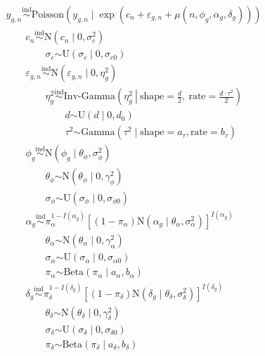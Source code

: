 \documentclass{article}\usepackage{graphicx, color}
\providecommand{\e}{\varepsilon}
\begin{document}
\begin{flushleft}
\begin{align*}
&y_{g,n} \stackrel{\text{ind}}{\sim} \text{Poisson}(y_{g, n} \mid \exp(c_n + \e_{g, n} + \mu(n, \phi_g, \alpha_g, \delta_g))) \\
&\qquad c_n \stackrel{\text{ind}}{\sim} \text{N}(c_n \mid 0, \sigma_c^2) \\
& \qquad \qquad \sigma_c \stackrel{\text{}}{\sim} \text{U}(\sigma_c \mid 0, \sigma_{c0}) \\
& \qquad \e_{g, n} \stackrel{\text{ind}}{\sim} \text{N}(\e_{g, n} \mid 0, \eta_g^2) \\
& \qquad \qquad \eta_g^2 \stackrel{\text{ind}}{\sim} \text{Inv-Gamma}\left (\eta_g^2 \ \left | \ \text{shape} = \frac{d}{2} \right ., \ \text{rate} =  \frac{d \cdot \tau^2}{2} \right) \\
& \qquad \qquad \qquad d \stackrel{\text{}}{\sim} \text{U}(d \mid 0, d_0) \\
& \qquad \qquad \qquad \tau^2 \stackrel{\text{}}{\sim} \text{Gamma}(\tau^2 \mid \text{shape} = a_\tau, \text{rate} = b_\tau) \\
& \qquad \phi_g \stackrel{\text{ind}}{\sim} \text{N}(\phi_g \mid \theta_\phi, \sigma_\phi^2) \\
& \qquad \qquad \theta_\phi \stackrel{\text{}}{\sim} \text{N}(\theta_\phi \mid 0, \gamma_{\phi }^2) \\
& \qquad \qquad \sigma_\phi \stackrel{\text{}}{\sim} \text{U}(\sigma_\phi \mid 0, \sigma_{\phi 0}) \\
& \qquad \alpha_g \stackrel{\text{ind}}{\sim} \pi_\alpha^{1-I(\alpha_g)}[(1- \pi_\alpha)\text{N}(\alpha_g \mid \theta_\alpha, \sigma_\alpha^2)]^{I(\alpha_g)} \\
& \qquad \qquad \theta_\alpha \stackrel{\text{}}{\sim} \text{N}(\theta_\alpha \mid 0, \gamma_{\alpha}^2) \\
& \qquad \qquad \sigma_\alpha \stackrel{\text{}}{\sim} \text{U}(\sigma_\alpha \mid 0, \sigma_{\alpha 0}) \\
& \qquad \qquad \pi_\alpha \stackrel{\text{}}{\sim} \text{Beta}(\pi_\alpha \mid a_{\alpha}, b_{\alpha}) \\
& \qquad \delta_g \stackrel{\text{ind}}{\sim} \pi_\delta^{1-I(\delta_g)}[(1- \pi_\delta)\text{N}(\delta_g \mid \theta_\delta, \sigma_\delta^2)]^{I(\delta_g)} \\& \qquad \qquad \theta_\delta \stackrel{\text{}}{\sim} \text{N}(\theta_\delta \mid 0, \gamma_{\delta}^2) \\
& \qquad \qquad \sigma_\delta \stackrel{\text{}}{\sim} \text{U}(\sigma_\delta \mid 0, \sigma_{\delta 0}) \\
& \qquad \qquad \pi_\delta \stackrel{\text{}}{\sim} \text{Beta}(\pi_\delta \mid a_{\delta}, b_{\delta}) \\
\end{align*}


\end{flushleft}
\end{document}
